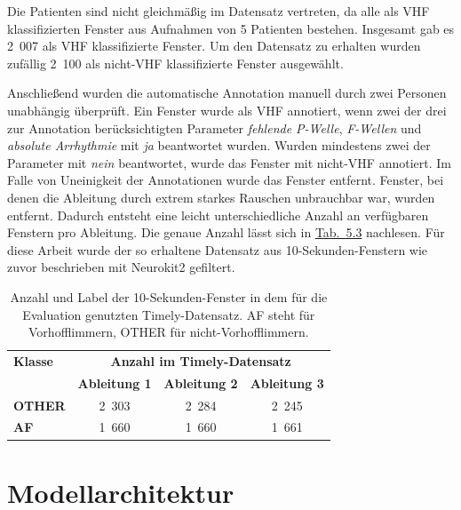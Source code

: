 Die Patienten sind nicht gleichmäßig im Datensatz vertreten, da alle als \gls{VHF} klassifizierten Fenster aus Aufnahmen von 5 Patienten bestehen. Insgesamt gab es 2~007 als \gls{VHF} klassifizierte Fenster. Um den Datensatz zu erhalten wurden zufällig 2~100 als nicht-\gls{VHF} klassifizierte Fenster ausgewählt. 

Anschließend wurden die automatische Annotation manuell durch zwei Personen unabhängig überprüft. Ein Fenster wurde als \gls{VHF} annotiert, wenn zwei der drei zur Annotation berücksichtigten Parameter \textit{fehlende P-Welle}, \textit{F-Wellen} und \textit{absolute Arrhythmie} mit \textit{ja} beantwortet wurden. Wurden mindestens zwei der Parameter mit \textit{nein} beantwortet, wurde das Fenster mit nicht-\gls{VHF} annotiert. Im Falle von Uneinigkeit der Annotationen wurde das Fenster entfernt. Fenster, bei denen die Ableitung durch extrem starkes Rauschen unbrauchbar war, wurden entfernt. Dadurch entsteht eine leicht unterschiedliche Anzahl an verfügbaren Fenstern pro Ableitung. Die genaue Anzahl lässt sich in \hyperref[tab:Klassenverteilung_Timely]{Tab.~5.3} nachlesen.
Für diese Arbeit wurde der so erhaltene Datensatz aus 10-Sekunden-Fenstern wie zuvor beschrieben mit Neurokit2 gefiltert. 

\begin{table}[h!]
\centering
\caption[Klassenverteilung im TIMELY-Datensatz]{Anzahl und Label der 10-Sekunden-Fenster in dem für die Evaluation genutzten Timely-Datensatz. AF steht für Vorhofflimmern, OTHER für nicht-Vorhofflimmern.}
\label{tab:Klassenverteilung_Timely}
\begin{tabular}{lccc}
\toprule
\textbf{Klasse}       & \multicolumn{3}{c}{\textbf{Anzahl im Timely-Datensatz}} \\ 
\cmidrule(lr){2-4}
                     & \textbf{Ableitung 1} & \textbf{Ableitung 2} & \textbf{Ableitung 3} \\ 
\midrule
\textbf{OTHER}       & 2~303  & 2~284  & 2~245  \\
\textbf{AF}          & 1~660  & 1~660  & 1~661  \\
\bottomrule
\end{tabular}
\end{table}



 

\section{Modellarchitektur}\label{sec:architektur}

